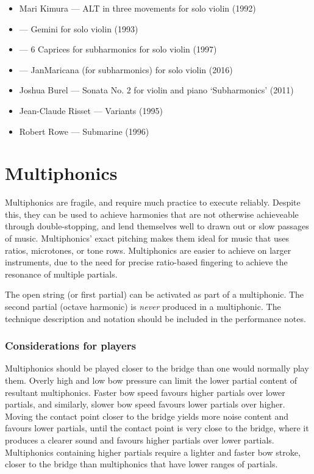 \begin{itemize}
    \item Mari Kimura --- ALT in three movements for solo violin (1992)
    \item --- Gemini for solo violin (1993)
    \item --- 6 Caprices for subharmonics for solo violin (1997) 
    \item --- JanMaricana (for subharmonics) for solo violin (2016)
    \item Joshua Burel --- Sonata No. 2 for violin and piano `Subharmonics' (2011)
    \item Jean-Claude Risset --- Variants (1995)
    \item Robert Rowe --- Submarine (1996)
\end{itemize}

\section{Multiphonics}\label{sec:multiphonics}

Multiphonics are fragile, and require much practice to execute reliably.
Despite this, they can be used to achieve harmonies that are not otherwise achieveable through double-stopping, and lend themselves well to drawn out or slow passages of music. 
Multiphonics' exact pitching makes them ideal for music that uses ratios, microtones, or tone rows. 
Multiphonics are easier to achieve on larger instruments, due to the need for precise ratio-based fingering to achieve the resonance of multiple partials.

The open string (or first partial) can be activated as part of a multiphonic.\autocite[161]{welbanksFoundationsModernCello}
The second partial (octave harmonic) is \emph{never} produced in a multiphonic.
The technique description and notation should be included in the performance notes.


\subsubsection{Considerations for players}
Multiphonics should be played closer to the bridge than one would normally play them.
Overly high and low bow pressure can limit the lower partial content of resultant multiphonics.
Faster bow speed favours higher partials over lower partials, and similarly, slower bow speed favours lower partials over higher.
Moving the contact point closer to the bridge yields more noise content and favours lower partials, until the contact point is very close to the bridge, where it produces a clearer sound and favours higher partials over lower partials.\autocite[http://www.cellomap.com/index/the-string/multiphonics-and-other-multiple-sounds.html]{fallowfieldCelloMap}
Multiphonics containing higher partials require a lighter and faster bow stroke, closer to the bridge than multiphonics that have lower ranges of partials.\autocite[165]{welbanksFoundationsModernCello}

